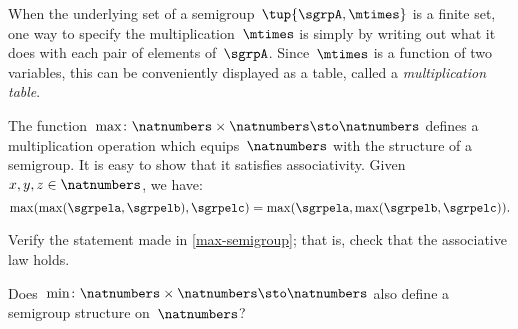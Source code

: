 When the underlying set of a semigroup~$\tup{\sgrpA, \mtimes}$ is a finite set, one way to specify the multiplication~$\mtimes$ is simply by writing out what it does with each pair of elements of~$\sgrpA$.
Since~$\mtimes$ is a function of two variables, this can be conveniently displayed as a table, called a \emph{multiplication table}.





\begin{example}
  \label{max-semigroup}
  The function~$\max \colon \natnumbers \times \natnumbers \sto \natnumbers$ defines a multiplication operation which equips~$\natnumbers$ with the structure of a semigroup.
It is easy to show that it satisfies associativity. Given~$x,y,z\in \natnumbers$, we have:
\begin{equation*}
\label{eq:max-assoc}
\max(\max(\sgrpela,\sgrpelb),\sgrpelc)=\max(\sgrpela,\max(\sgrpelb,\sgrpelc)).
\end{equation*}
\end{example}

\begin{exercise}
  \label{ex:max-semigroup}
  Verify the statement made in \cref{max-semigroup}; that is, check that the associative law holds.

  Does~$\min \colon \natnumbers \times \natnumbers \sto \natnumbers$ also define a semigroup structure on~$\natnumbers$?
\end{exercise}
\begin{solution}
\end{solution}


